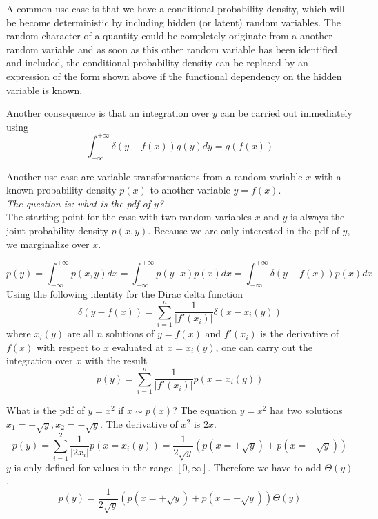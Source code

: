 \documentclass{tstextbook}
\begin{document}
A common use-case is that we have a conditional probability density, which will be become deterministic by including hidden (or latent) random variables. The random character of a quantity could be completely originate from a another random variable and as soon as this other random variable has been identified and included, the conditional probability density can be replaced by an expression of the form shown above if the functional dependency on the hidden variable is known.

Another consequence is that an integration over $y$ can be carried out immediately using
  \begin{equation}
    \int_{-\infty}^{+\infty}\delta\left(y-f(x)\right)g(y)dy = g(f(x))
  \end{equation} 

Another use-case are variable transformations from a random variable $x$ with a known probability density $p(x)$ to another variable $y=f(x)$.\\

\textit{The question is: what is the pdf of $y$?}\\

The starting point for the case with two random variables $x$ and $y$ is always the joint probability density $p(x,y)$. Because we are only interested in the pdf of $y$, we marginalize over $x$.

  \begin{equation}
    p(y)=\int_{-\infty}^{+\infty}p(x,y)dx=
    \int_{-\infty}^{+\infty}p(y\,\vert\, x)p(x)dx=\int_{-\infty}^{+\infty}\delta\left(y-f(x)\right)p(x)dx
  \end{equation}
Using the following identity for the Dirac delta function
  \begin{equation}
   \delta\left(y-f(x)\right)=\sum_{i=1}^{n}\frac{1}{\vert f'(x_i)\vert}\delta(x-x_i(y))
  \end{equation}
where $x_i(y)$ are all $n$ solutions of $y=f(x)$ and $f'(x_i)$ is the derivative of $f(x)$ with respect to $x$ evaluated at $x=x_i(y)$, one can carry out the integration over $x$ with the result
  \begin{equation}
    p(y)=\sum_{i=1}^{n}\frac{1}{\vert f'(x_i)\vert}p\left(x=x_i(y)\right)
  \end{equation}

\begin{example}
What is the pdf of $y=x^2$ if $x\sim p(x)$? The equation $y=x^2$ has two solutions $x_1=+\sqrt{y},x_2=-\sqrt{y}$. The derivative of $x^2$ is $2x$.
  \begin{equation}
    p(y)=\sum_{i=1}^{2}\frac{1}{\vert 2x_i\vert}p\left(x=x_i(y)\right)=
    \frac{1}{2\sqrt{y}}\left(p\left(x=+\sqrt{y}\right)+p\left(x=-\sqrt{y}\right)\right)
  \end{equation}
$y$ is only defined for values in the range $[0,\infty]$. Therefore we have to add $\Theta(y)$.
  \begin{equation}
    p(y)=\frac{1}{2\sqrt{y}}\left(p\left(x=+\sqrt{y}\right)+p\left(x=-\sqrt{y}\right)\right)\Theta(y)
  \end{equation} 
\end{example}
\end{document}

